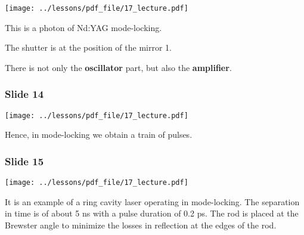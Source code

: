 \documentclass[../main/main.tex]{subfiles}
\begin{document}
\begin{minipage}[]{0.5\linewidth}
\centering
\texttt{[image: ../lessons/pdf\_file/17\_lecture.pdf]}
\end{minipage}
\hspace{0.3cm}\vspace{0.3cm}
\begin{minipage}[c]{0.47\linewidth}

This is a photon of Nd:YAG mode-locking.

The shutter is at the position of the mirror 1.

There is not only the \textbf{oscillator} part, but also the \textbf{amplifier}.



\end{minipage}

\subsubsection*{Slide 14}

\begin{minipage}[]{0.5\linewidth}
\centering
\texttt{[image: ../lessons/pdf\_file/17\_lecture.pdf]}
\end{minipage}
\hspace{0.3cm}\vspace{0.3cm}
\begin{minipage}[c]{0.47\linewidth}

Hence, in mode-locking we obtain a train of pulses.

\end{minipage}

\subsubsection*{Slide 15}

\begin{minipage}[]{0.5\linewidth}
\centering
\texttt{[image: ../lessons/pdf\_file/17\_lecture.pdf]}
\end{minipage}
\hspace{0.3cm}\vspace{0.3cm}
\begin{minipage}[c]{0.47\linewidth}

It is an example of a ring cavity laser operating in mode-locking. The separation in time is of about 5 ns with a pulse duration of 0.2 ps. The rod is placed at the Brewster angle to minimize the losses in reflection at the edges of the rod.

\end{minipage}
\end{document}
